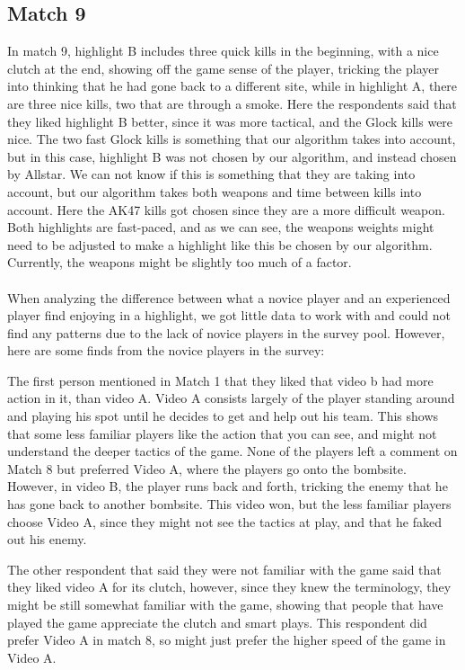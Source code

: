 \subsection*{Match 9}
In match 9, highlight B includes three quick kills in the beginning, with a nice clutch at the end, showing off the game sense of the player, tricking the player into thinking that he had gone back to a different site, while in highlight A, there are three nice kills, two that are through a smoke. Here the respondents said that they liked highlight B better, since it was more tactical, and the Glock kills were nice. The two fast Glock kills is something that our algorithm takes into account, but in this case, highlight B was not chosen by our algorithm, and instead chosen by Allstar. We can not know if this is something that they are taking into account, but our algorithm takes both weapons and time between kills into account. Here the AK47 kills got chosen since they are a more difficult weapon. Both highlights are fast-paced, and as we can see, the weapons weights might need to be adjusted to make a highlight like this be chosen by our algorithm. Currently, the weapons might be slightly too much of a factor. \\\\

When analyzing the difference between what a novice player and an experienced player find enjoying in a highlight, we got little data to work with and could not find any patterns due to the lack of novice players in the survey pool. However, here are some finds from the novice players in the survey:

The first person mentioned in Match 1 that they liked that video b had more action in it, than video A. Video A consists largely of the player standing around and playing his spot until he decides to get and help out his team. This shows that some less familiar players like the action that you can see, and might not understand the deeper tactics of the game. None of the players left a comment on Match 8 but preferred Video A, where the players go onto the bombsite. However, in video B, the player runs back and forth, tricking the enemy that he has gone back to another bombsite. This video won, but the less familiar players choose Video A, since they might not see the tactics at play, and that he faked out his enemy.

The other respondent that said they were not familiar with the game said that they liked video A for its clutch, however, since they knew the terminology, they might be still somewhat familiar with the game, showing that people that have played the game appreciate the clutch and smart plays. This respondent did prefer Video A in match 8, so might just prefer the higher speed of the game in Video A.






